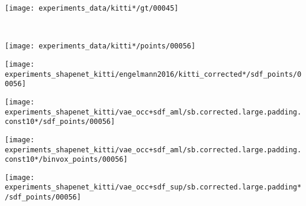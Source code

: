 \begin{minipage}[t]{0.1\textwidth}
    \vspace{0px}
    \centering
    \texttt{[image: experiments\_data/kitti*/gt/00045]}
\end{minipage}\\
\begin{minipage}[t]{0.02\textwidth}
    \vspace{0px}
\end{minipage}
\begin{minipage}[t]{0.1\textwidth}
    \vspace{0px}
    \centering
    \texttt{[image: experiments\_data/kitti*/points/00056]}
\end{minipage}
\begin{minipage}[t]{0.09\textwidth}
    \vspace{0px}
    \centering
\end{minipage}
\begin{minipage}[t]{0.1\textwidth}
    \vspace{0px}
    \centering
    \texttt{[image: experiments\_shapenet\_kitti/engelmann2016/kitti\_corrected*/sdf\_points/00056]}
\end{minipage}
\begin{minipage}[t]{0.1\textwidth}
    \vspace{0px}
    \centering
    \texttt{[image: experiments\_shapenet\_kitti/vae\_occ+sdf\_aml/sb.corrected.large.padding.const10*/sdf\_points/00056]}
\end{minipage}
\begin{minipage}[t]{0.1\textwidth}
    \vspace{0px}
    \centering
    \texttt{[image: experiments\_shapenet\_kitti/vae\_occ+sdf\_aml/sb.corrected.large.padding.const10*/binvox\_points/00056]}
\end{minipage}
\begin{minipage}[t]{0.1\textwidth}
    \vspace{0px}
    \centering
    \texttt{[image: experiments\_shapenet\_kitti/vae\_occ+sdf\_sup/sb.corrected.large.padding*/sdf\_points/00056]}
\end{minipage}
